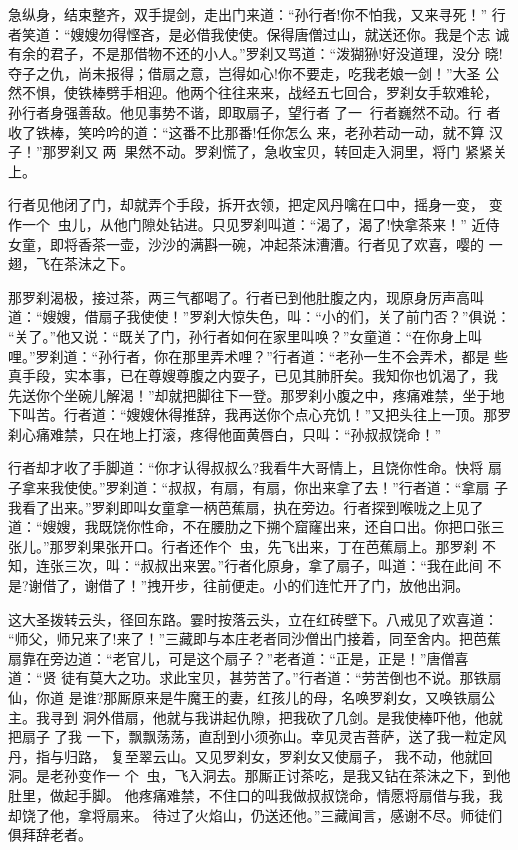 急纵身，结束整齐，双手提剑，走出门来道：“孙行者!你不怕我，又来寻死！”
行者笑道：“嫂嫂勿得悭吝，是必借我使使。保得唐僧过山，就送还你。我是个志
诚有余的君子，不是那借物不还的小人。”罗刹又骂道：“泼猢狲!好没道理，没分
晓!夺子之仇，尚未报得；借扇之意，岂得如心!你不要走，吃我老娘一剑！”大圣
公然不惧，使铁棒劈手相迎。他两个往往来来，战经五七回合，罗刹女手软难轮，
孙行者身强善敌。他见事势不谐，即取扇子，望行者了一，行者巍然不动。行
者收了铁棒，笑吟吟的道：“这番不比那番!任你怎么来，老孙若动一动，就不算
汉子！”那罗刹又两，果然不动。罗刹慌了，急收宝贝，转回走入洞里，将门
紧紧关上。

行者见他闭了门，却就弄个手段，拆开衣领，把定风丹噙在口中，摇身一变，
变作一个虫儿，从他门隙处钻进。只见罗刹叫道：“渴了，渴了!快拿茶来！”
近侍女童，即将香茶一壶，沙沙的满斟一碗，冲起茶沫漕漕。行者见了欢喜，嘤的
一翅，飞在茶沫之下。

那罗刹渴极，接过茶，两三气都喝了。行者已到他肚腹之内，现原身厉声高叫
道：“嫂嫂，借扇子我使使！”罗刹大惊失色，叫：“小的们，关了前门否？”俱说：
“关了。”他又说：“既关了门，孙行者如何在家里叫唤？”女童道：“在你身上叫
哩。”罗刹道：“孙行者，你在那里弄术哩？”行者道：“老孙一生不会弄术，都是
些真手段，实本事，已在尊嫂尊腹之内耍子，已见其肺肝矣。我知你也饥渴了，我
先送你个坐碗儿解渴！”却就把脚往下一登。那罗刹小腹之中，疼痛难禁，坐于地
下叫苦。行者道：“嫂嫂休得推辞，我再送你个点心充饥！”又把头往上一顶。那罗
刹心痛难禁，只在地上打滚，疼得他面黄唇白，只叫：“孙叔叔饶命！”

行者却才收了手脚道：“你才认得叔叔么?我看牛大哥情上，且饶你性命。快将
扇子拿来我使使。”罗刹道：“叔叔，有扇，有扇，你出来拿了去！”行者道：“拿扇
子我看了出来。”罗刹即叫女童拿一柄芭蕉扇，执在旁边。行者探到喉咙之上见了
道：“嫂嫂，我既饶你性命，不在腰肋之下搠个窟窿出来，还自口出。你把口张三
张儿。”那罗刹果张开口。行者还作个虫，先飞出来，丁在芭蕉扇上。那罗刹
不知，连张三次，叫：“叔叔出来罢。”行者化原身，拿了扇子，叫道：“我在此间
不是?谢借了，谢借了！”拽开步，往前便走。小的们连忙开了门，放他出洞。

这大圣拨转云头，径回东路。霎时按落云头，立在红砖壁下。八戒见了欢喜道：
“师父，师兄来了!来了！”三藏即与本庄老者同沙僧出门接着，同至舍内。把芭蕉
扇靠在旁边道：“老官儿，可是这个扇子？”老者道：“正是，正是！”唐僧喜道：“贤
徒有莫大之功。求此宝贝，甚劳苦了。”行者道：“劳苦倒也不说。那铁扇仙，你道
是谁?那厮原来是牛魔王的妻，红孩儿的母，名唤罗刹女，又唤铁扇公主。我寻到
洞外借扇，他就与我讲起仇隙，把我砍了几剑。是我使棒吓他，他就把扇子了我
一下，飘飘荡荡，直刮到小须弥山。幸见灵吉菩萨，送了我一粒定风丹，指与归路，
复至翠云山。又见罗刹女，罗刹女又使扇子，我不动，他就回洞。是老孙变作一
个虫，飞入洞去。那厮正讨茶吃，是我又钻在茶沫之下，到他肚里，做起手脚。
他疼痛难禁，不住口的叫我做叔叔饶命，情愿将扇借与我，我却饶了他，拿将扇来。
待过了火焰山，仍送还他。”三藏闻言，感谢不尽。师徒们俱拜辞老者。

